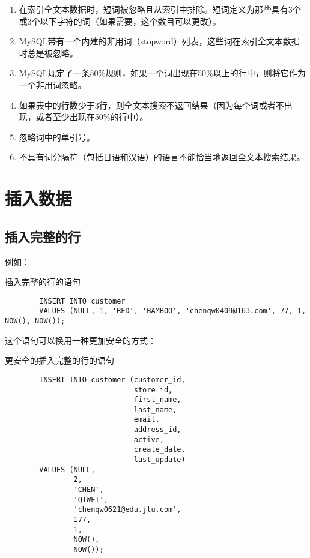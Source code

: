 \documentclass[UTF8]{article}
\begin{document}
\begin{orangebox}[frametitle={Tips 18.4.4 全文本搜索的使用说明}]
        \begin{enumerate}
                \item 在索引全文本数据时，短词被忽略且从索引中排除。短词定义为那些具有3个或3个以下字符的词（如果需要，这个数目可以更改）。
                \item MySQL带有一个内建的非用词（stopword）列表，这些词在索引全文本数据时总是被忽略。
                \item MySQL规定了一条50\%规则，如果一个词出现在50\%以上的行中，则将它作为一个非用词忽略。
                \item 如果表中的行数少于3行，则全文本搜索不返回结果（因为每个词或者不出现，或者至少出现在50\%的行中）。
                \item 忽略词中的单引号。
                \item 不具有词分隔符（包括日语和汉语）的语言不能恰当地返回全文本搜索结果。
        \end{enumerate}
\end{orangebox}  

\section{插入数据}
\subsection{插入完整的行}

例如：

\begin{listing}[H]
        \caption{插入完整的行的语句}
	\label{code:insertrowclause}
\begin{verbatim}
        INSERT INTO customer 
        VALUES (NULL, 1, 'RED', 'BAMBOO', 'chenqw0409@163.com', 77, 1, NOW(), NOW());
\end{verbatim}
\end{listing}

这个语句可以换用一种更加安全的方式：

\begin{listing}[H]
        \caption{更安全的插入完整的行的语句}
	\label{code:moresafeinsertrowclause}
\begin{verbatim}
        INSERT INTO customer (customer_id,
                              store_id,
                              first_name,
                              last_name,
                              email,
                              address_id,
                              active,
                              create_date,
                              last_update)
        VALUES (NULL,
                2,
                'CHEN',
                'QIWEI',
                'chenqw0621@edu.jlu.com', 
                177,
                1,
                NOW(),
                NOW());
\end{verbatim}
\end{listing}
\end{document}
